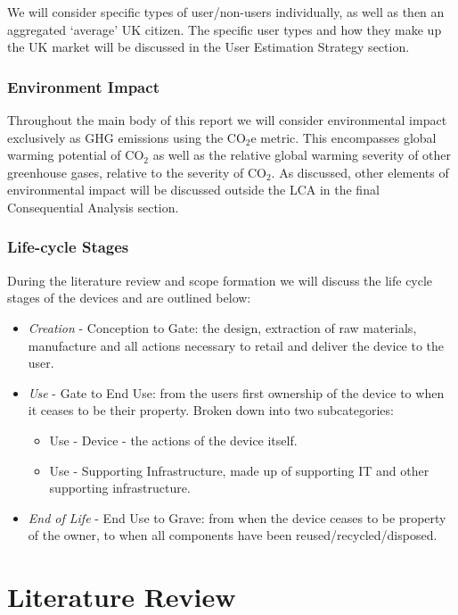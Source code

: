 \documentclass[conference]{IEEEtran}
\begin{document}
We will consider specific types of user/non-users individually, as
well as then an aggregated `average' UK citizen. The specific user
types and how they make up the UK market will be discussed in the User
Estimation Strategy section.

\subsubsection{Environment Impact}

Throughout the main body of this report we will consider environmental
impact exclusively as GHG emissions using the CO$_2$e metric. This
encompasses global warming potential of CO$_2$ as well as the relative
global warming severity of other greenhouse gases, relative to the
severity of CO$_2$. As discussed, other elements of environmental impact
will be discussed outside the LCA in the final Consequential Analysis
section.

\subsubsection{Life-cycle Stages}

During the literature review and scope formation we will discuss the
life cycle stages of the devices and are outlined below:

\begin{itemize}
\item {\emph{Creation}} - Conception to Gate: the design, extraction of raw
  materials, manufacture and all actions necessary to retail and
  deliver the device to the user.
\item {\emph{Use}} - Gate to End Use: from the users first ownership
  of the device to when it ceases to be their property. Broken down
  into two subcategories:
\begin{itemize}
\item Use - Device - the actions of the device itself.
\item Use - Supporting Infrastructure, made up of supporting IT and
  other supporting infrastructure.
\end{itemize}
\item {\emph{End of Life}} - End Use to Grave: from when the device
  ceases to be property of the owner, to when all components have been
  reused/recycled/disposed.
\end{itemize}


\section{Literature Review}
\end{document}
